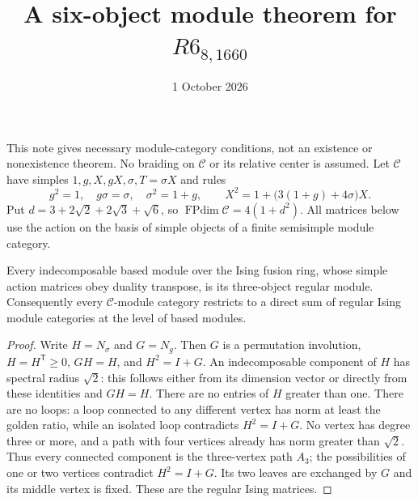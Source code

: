 \documentclass[11pt]{article}
\title{A six-object module theorem for $R6_{8,1660}$}
\author{}\date{1 October 2026}
\newcommand{\C}{\mathcal C}\newcommand{\I}{\mathcal I}\newcommand{\M}{\mathcal M}
\newcommand{\FPdim}{\operatorname{FPdim}}
\begin{document}
\maketitle
This note gives necessary module-category conditions, not an existence or
nonexistence theorem. No braiding on $\C$ or its relative center is assumed.
Let $\C$ have simples $1,g,X,gX,\sigma,T=\sigma X$ and rules
\[
g^2=1,\quad g\sigma=\sigma,\quad\sigma^2=1+g,\qquad
X^2=1+\bigl(3(1+g)+4\sigma\bigr)X.
\]
Put $d=3+2\sqrt2+2\sqrt3+\sqrt6$, so $\FPdim\C=4(1+d^2)$.
All matrices below use the action on the basis of simple objects of a
finite semisimple module category.

\begin{lemma}
Every indecomposable based module over the Ising fusion ring, whose
simple action matrices obey duality transpose, is its three-object regular
module. Consequently every $\C$-module category restricts to a direct sum
of regular Ising module categories at the level of based modules.
\end{lemma}
\begin{proof}
Write $H=N_\sigma$ and $G=N_g$. Then $G$ is a permutation involution,
$H=H^{\mathsf T}\geq0$, $GH=H$, and $H^2=I+G$. An indecomposable
component of $H$ has spectral radius $\sqrt2$: this follows either from
its dimension vector or directly from these identities and $GH=H$.
There are no entries of $H$ greater than one. There are no loops: a loop
connected to any different vertex has norm at least the golden ratio,
while an isolated loop contradicts $H^2=I+G$. No vertex has degree three
or more, and a path with four vertices already has norm greater than
$\sqrt2$. Thus every connected component is the three-vertex path
$A_3$; the possibilities of one or two vertices contradict $H^2=I+G$.
Its two leaves are exchanged by $G$ and its middle vertex is fixed.
These are the regular Ising matrices.
\end{proof}
\end{document}
